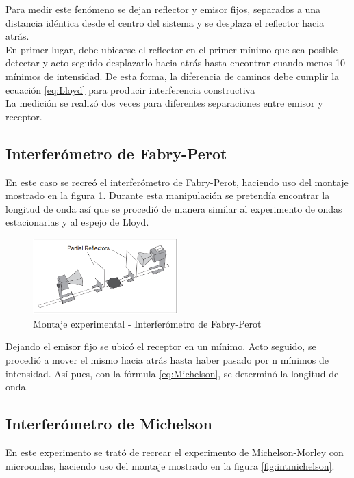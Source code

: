 \documentclass[prb,aps,twocolumn,preprintnumbers,amsmath,amssymb]{revtex4}
\begin{document}
Para medir este fenómeno se dejan reflector y emisor fijos, separados a una distancia idéntica desde el centro del sistema y se desplaza el reflector hacia atrás. \\

En primer lugar, debe ubicarse el reflector en el primer mínimo que sea posible detectar y acto seguido desplazarlo hacia atrás hasta encontrar cuando menos 10 mínimos de intensidad. De esta forma, la diferencia de caminos debe cumplir la ecuación \eqref{eq:Lloyd} para producir interferencia constructiva\\

La medición se realizó dos veces para diferentes separaciones entre emisor y receptor.


\subsection{Interferómetro de Fabry-Perot} 

En este caso se recreó el interferómetro de Fabry-Perot, haciendo uso del montaje mostrado en la figura \ref{fig:fabryperot}. Durante esta manipulación se pretendía encontrar la longitud de onda así que se procedió de manera similar al experimento de ondas estacionarias y al espejo de Lloyd.\\


\begin{figure}[h!]
\centering
\includegraphics[width=0.5\textwidth]{fabry}
\caption{Montaje experimental - Interferómetro de Fabry-Perot}
\label{fig:fabryperot}
\end{figure}

Dejando el emisor fijo se ubicó el receptor en un mínimo. Acto seguido, se procedió a mover el mismo hacia atrás hasta haber pasado por n mínimos de intensidad. Así pues, con la fórmula \ref{eq:Michelson}, se determinó la longitud de onda. 

\subsection{Interferómetro de Michelson} 

En este experimento se trató de recrear el experimento de Michelson-Morley con microondas, haciendo uso del montaje mostrado en la figura \ref{fig:intmichelson}. 
\end{document}
